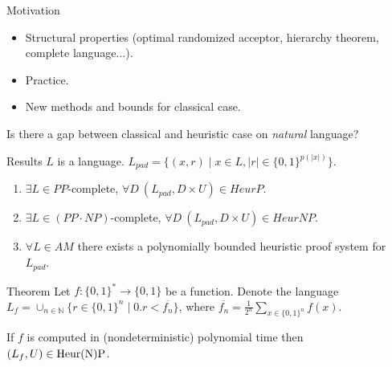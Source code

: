 \begin{frame}{}
\begin{columns}[t]
\begin{column}{0.32\linewidth}
    \end{column}%

	\begin{column}{0.32\linewidth}
        
		\begin{block}{Motivation}
			\begin{itemize}
			    \item Structural properties (optimal randomized acceptor, hierarchy
		            theorem, complete language...). 
		    	\item Practice.
		        \item New methods and bounds for classical case.
		    \end{itemize}

            Is there a gap between classical and heuristic case on {\em natural}
            language?
        \end{block}

        \begin{block}{Results}
            $L$ is a language.
		    $L_{pad} = \{(x, r) \mid x \in L, |r| \in \{0, 1 \}^{p(|x|)}\}$.
    
		    \begin{enumerate}
				\item $\exists L \in PP$-complete, $\forall D~
		    		(L_{pad}, D \times U) \in HeurP$.
		    	\item $\exists L \in (PP \cdot NP)$-complete, $\forall D~
				    (L_{pad}, D \times U) \in HeurNP$.
		    	\item $\forall L \in AM$ there exists a polynomially bounded
    				heuristic proof system for $L_{pad}$.
            \end{enumerate}
        \end{block}

        \begin{alertblock}{Theorem}
            Let $f:\{0,1\}^* \to \{0,1\}$ be a function. Denote the language
            $L_f = \cup_{n \in \mathbb{N}} \{r \in \{0, 1\}^n \mid 0.r <
            \overline{f_n} \}$, where $\overline{f_n} = \frac{1}{2^n}
            \sum_{x \in \{0,1\}^n}f(x)$.

            If $f$ is computed in (nondeterministic) polynomial time then $(L_f,U)
            \in \rm Heur(N)P$. 
        \end{alertblock}


\end{column}
\end{columns}
\end{frame}

